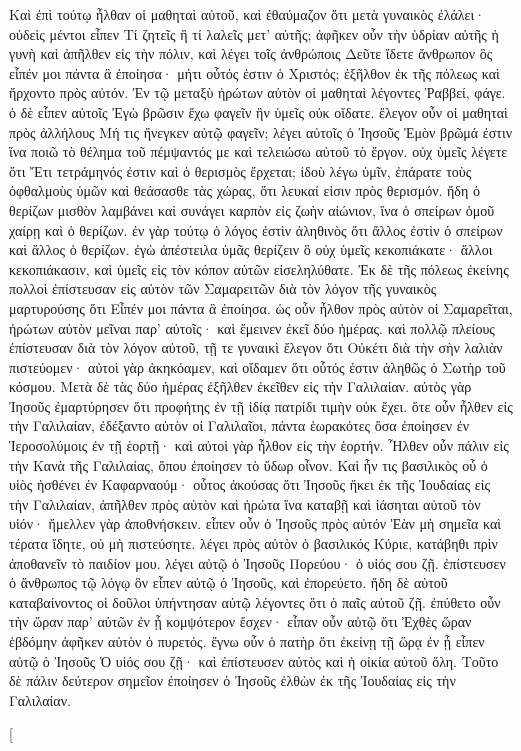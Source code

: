 \begin{pages}
\begin{Rightside}
		\pend
		\pstart
		Καὶ ἐπὶ τούτῳ ἦλθαν οἱ μαθηταὶ αὐτοῦ, καὶ ἐθαύμαζον ὅτι μετὰ γυναικὸς ἐλάλει· οὐδεὶς μέντοι εἶπεν Τί ζητεῖς ἢ τί λαλεῖς μετ’ αὐτῆς; ἀφῆκεν οὖν τὴν ὑδρίαν αὐτῆς ἡ γυνὴ καὶ ἀπῆλθεν εἰς τὴν πόλιν, καὶ λέγει τοῖς ἀνθρώποις Δεῦτε ἴδετε ἄνθρωπον ὃς εἶπέν μοι πάντα ἃ ἐποίησα· μήτι οὗτός ἐστιν ὁ Χριστός; ἐξῆλθον ἐκ τῆς πόλεως καὶ ἤρχοντο πρὸς αὐτόν. Ἐν τῷ μεταξὺ ἠρώτων αὐτὸν οἱ μαθηταὶ λέγοντες Ῥαββεί, φάγε. ὁ δὲ εἶπεν αὐτοῖς Ἐγὼ βρῶσιν ἔχω φαγεῖν ἣν ὑμεῖς οὐκ οἴδατε. ἔλεγον οὖν οἱ μαθηταὶ πρὸς ἀλλήλους Μή τις ἤνεγκεν αὐτῷ φαγεῖν; λέγει αὐτοῖς ὁ Ἰησοῦς Ἐμὸν βρῶμά ἐστιν ἵνα ποιῶ τὸ θέλημα τοῦ πέμψαντός με καὶ τελειώσω αὐτοῦ τὸ ἔργον. οὐχ ὑμεῖς λέγετε ὅτι Ἔτι τετράμηνός ἐστιν καὶ ὁ θερισμὸς ἔρχεται; ἰδοὺ λέγω ὑμῖν, ἐπάρατε τοὺς ὀφθαλμοὺς ὑμῶν καὶ θεάσασθε τὰς χώρας, ὅτι λευκαί εἰσιν πρὸς θερισμόν. ἤδη ὁ θερίζων μισθὸν λαμβάνει καὶ συνάγει καρπὸν εἰς ζωὴν αἰώνιον, ἵνα ὁ σπείρων ὁμοῦ χαίρῃ καὶ ὁ θερίζων. ἐν γὰρ τούτῳ ὁ λόγος ἐστὶν ἀληθινὸς ὅτι ἄλλος ἐστὶν ὁ σπείρων καὶ ἄλλος ὁ θερίζων. ἐγὼ ἀπέστειλα ὑμᾶς θερίζειν ὃ οὐχ ὑμεῖς κεκοπιάκατε· ἄλλοι κεκοπιάκασιν, καὶ ὑμεῖς εἰς τὸν κόπον αὐτῶν εἰσεληλύθατε. 
		\pend
		\pstart
		Ἐκ δὲ τῆς πόλεως ἐκείνης πολλοὶ ἐπίστευσαν εἰς αὐτὸν τῶν Σαμαρειτῶν διὰ τὸν λόγον τῆς γυναικὸς μαρτυρούσης ὅτι Εἶπέν μοι πάντα ἃ ἐποίησα. ὡς οὖν ἦλθον πρὸς αὐτὸν οἱ Σαμαρεῖται, ἠρώτων αὐτὸν μεῖναι παρ’ αὐτοῖς· καὶ ἔμεινεν ἐκεῖ δύο ἡμέρας. καὶ πολλῷ πλείους ἐπίστευσαν διὰ τὸν λόγον αὐτοῦ, τῇ τε γυναικὶ ἔλεγον ὅτι Οὐκέτι διὰ τὴν σὴν λαλιὰν πιστεύομεν· αὐτοὶ γὰρ ἀκηκόαμεν, καὶ οἴδαμεν ὅτι οὗτός ἐστιν ἀληθῶς ὁ Σωτὴρ τοῦ κόσμου.
		\pend
		\pstart
		Μετὰ δὲ τὰς δύο ἡμέρας ἐξῆλθεν ἐκεῖθεν εἰς τὴν Γαλιλαίαν. αὐτὸς γὰρ Ἰησοῦς ἐμαρτύρησεν ὅτι προφήτης ἐν τῇ ἰδίᾳ πατρίδι τιμὴν οὐκ ἔχει. ὅτε οὖν ἦλθεν εἰς τὴν Γαλιλαίαν, ἐδέξαντο αὐτὸν οἱ Γαλιλαῖοι, πάντα ἑωρακότες ὅσα ἐποίησεν ἐν Ἱεροσολύμοις ἐν τῇ ἑορτῇ· καὶ αὐτοὶ γὰρ ἦλθον εἰς τὴν ἑορτήν. 
		\pend
		\pstart
		Ἦλθεν οὖν πάλιν εἰς τὴν Κανὰ τῆς Γαλιλαίας, ὅπου ἐποίησεν τὸ ὕδωρ οἶνον. Καὶ ἦν τις βασιλικὸς οὗ ὁ υἱὸς ἠσθένει ἐν Καφαρναούμ· οὗτος ἀκούσας ὅτι Ἰησοῦς ἥκει ἐκ τῆς Ἰουδαίας εἰς τὴν Γαλιλαίαν, ἀπῆλθεν πρὸς αὐτὸν καὶ ἠρώτα ἵνα καταβῇ καὶ ἰάσηται αὐτοῦ τὸν υἱόν· ἤμελλεν γὰρ ἀποθνήσκειν. εἶπεν οὖν ὁ Ἰησοῦς πρὸς αὐτόν Ἐὰν μὴ σημεῖα καὶ τέρατα ἴδητε, οὐ μὴ πιστεύσητε. λέγει πρὸς αὐτὸν ὁ βασιλικός Κύριε, κατάβηθι πρὶν ἀποθανεῖν τὸ παιδίον μου. λέγει αὐτῷ ὁ Ἰησοῦς Πορεύου· ὁ υἱός σου ζῇ. ἐπίστευσεν ὁ ἄνθρωπος τῷ λόγῳ ὃν εἶπεν αὐτῷ ὁ Ἰησοῦς, καὶ ἐπορεύετο. ἤδη δὲ αὐτοῦ καταβαίνοντος οἱ δοῦλοι ὑπήντησαν αὐτῷ λέγοντες ὅτι ὁ παῖς αὐτοῦ ζῇ. ἐπύθετο οὖν τὴν ὥραν παρ’ αὐτῶν ἐν ᾗ κομψότερον ἔσχεν· εἶπαν οὖν αὐτῷ ὅτι Ἐχθὲς ὥραν ἑβδόμην ἀφῆκεν αὐτὸν ὁ πυρετός. ἔγνω οὖν ὁ πατὴρ ὅτι ἐκείνῃ τῇ ὥρᾳ ἐν ᾗ εἶπεν αὐτῷ ὁ Ἰησοῦς Ὁ υἱός σου ζῇ· καὶ ἐπίστευσεν αὐτὸς καὶ ἡ οἰκία αὐτοῦ ὅλη. Τοῦτο δὲ πάλιν δεύτερον σημεῖον ἐποίησεν ὁ Ἰησοῦς ἐλθὼν ἐκ τῆς Ἰουδαίας εἰς τὴν Γαλιλαίαν.
		\pend
        \endnumbering
    \end{Rightside}
    \begin{Leftside}
        \beginnumbering
        \pstart[

\end{Leftside}
\end{pages}
